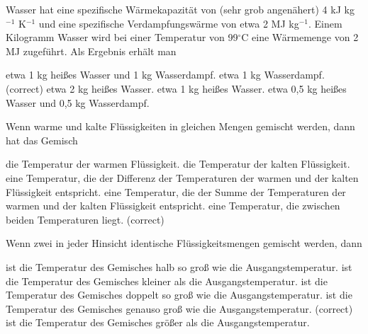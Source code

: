 \documentclass[11pt]{exam}
\begin{document}
\setlength{\voffset}{-0.5in}
\setlength{\headsep}{5pt}

\hspace{2mm}
 \hspace{5mm}
\vspace{4mm}

\begin{questions}

\question Wasser hat eine spezifische Wärmekapazität von (sehr grob angenähert) 4 kJ kg\(^{-1}\) K\(^{-1}\) und eine spezifische Verdampfungswärme von etwa 2 MJ kg\(^{-1}\). Einem Kilogramm Wasser wird bei einer Temperatur von 99\(^\circ\)C eine Wärmemenge von 2 MJ zugeführt. Als Ergebnis erhält man

\begin{choices}
	\choice etwa 1 kg heißes Wasser und 1 kg Wasserdampf.
	\choice etwa 1 kg Wasserdampf. (correct)
	\choice etwa 2 kg heißes Wasser.
	\choice etwa 1 kg heißes Wasser.
	\choice etwa 0,5 kg heißes Wasser und 0,5 kg Wasserdampf.
\end{choices}

\vspace{3mm}\question Wenn warme und kalte Flüssigkeiten in gleichen Mengen gemischt werden, dann hat das Gemisch

\begin{choices}
	\choice die Temperatur der warmen Flüssigkeit.
	\choice die Temperatur der kalten Flüssigkeit.
	\choice eine Temperatur, die der Differenz der Temperaturen der warmen und der kalten Flüssigkeit entspricht.
	\choice eine Temperatur, die der Summe der Temperaturen der warmen und der kalten Flüssigkeit entspricht.
	\choice eine Temperatur, die zwischen beiden Temperaturen liegt. (correct)
\end{choices}

\vspace{3mm}\question Wenn zwei in jeder Hinsicht identische Flüssigkeitsmengen gemischt werden, dann

\begin{choices}
	\choice ist die Temperatur des Gemisches halb so groß wie die Ausgangstemperatur.
	\choice ist die Temperatur des Gemisches kleiner als die Ausgangstemperatur.
	\choice ist die Temperatur des Gemisches doppelt so groß wie die Ausgangstemperatur.
	\choice ist die Temperatur des Gemisches genauso groß wie die Ausgangstemperatur. (correct)
	\choice ist die Temperatur des Gemisches größer als die Ausgangstemperatur.
\end{choices}


\end{questions}
\end{document}
